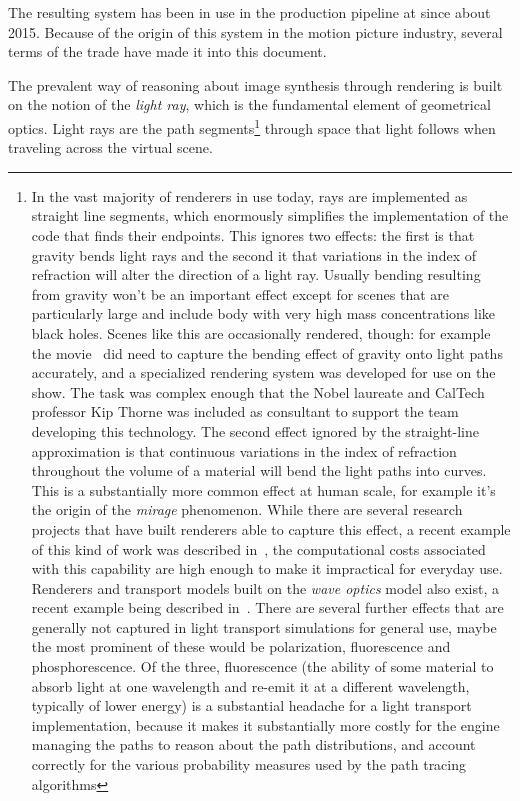 The resulting system has been in use in the
production pipeline at  since about 2015.
Because of the origin of this system in the motion picture industry,
several terms of the trade have made it into this document. 


The prevalent way of reasoning about image synthesis through rendering is 
built on the notion of the \textsl{light ray}, which is the fundamental element 
of geometrical optics. 
Light rays are the path segments\footnote{
	In the vast majority of renderers in use today, rays are implemented as 
	straight line segments, which enormously simplifies the implementation of the
	code that finds their endpoints. This ignores two effects: the first is that 
	gravity bends light rays and the second it that variations in the index
	of refraction will alter the direction of a light ray.
	Usually bending resulting from gravity won't be an important effect except 
	for scenes that are particularly large and include body with very high mass 
	concentrations like black holes.
	Scenes like this are occasionally rendered, though: for example the 
	movie~\cite{interstellar2014} did need to capture the bending effect of 
	gravity onto light paths accurately, and a specialized rendering system 
	was developed for use on the show. 
	The task was complex enough that the Nobel laureate and CalTech professor 
	Kip Thorne was included as consultant to support the team developing this 
	technology. 
	The second effect ignored by the straight-line approximation is that 
	continuous variations in the index of refraction throughout the volume of a material 
	will bend the light paths into curves. 
	This is a substantially more common effect at human scale, for example 
	it's the origin of the \textsl{mirage} phenomenon. 
	While there are several research projects that have built renderers able 
	to capture this effect, a recent example
	of this kind of work was described in~\cite{fraboni23}, 
	the computational costs associated with this capability 
	are high enough to make it impractical for everyday use.
	Renderers and transport models built on the \emph{wave optics} model also exist,
	a recent example being described in~\cite{yu23}.
	There are several further effects that are generally not captured in 
	light transport simulations for general use, maybe the most prominent of these would be
	polarization, fluorescence and phosphorescence. Of the three, fluorescence
	(the ability of some material to absorb light at one wavelength and re-emit it
	at a different wavelength, typically of lower energy) is a substantial headache for
	a light transport implementation, because it makes it substantially more costly for the 
	engine managing the paths to reason about the path distributions, and account correctly
	for the various probability measures used by the path tracing algorithms
} through space that light follows when traveling across the \gls{virtual scene}. 

